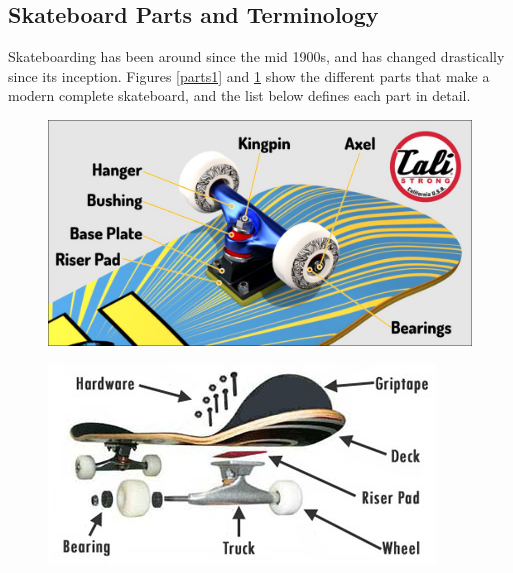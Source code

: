 \documentclass[letterpaper,12pt]{article}
\begin{document}
\subsection{Skateboard Parts and Terminology}
Skateboarding has been around since the mid 1900s, and has changed drastically since its inception. Figures \ref{parts1} and \ref{parts2} show the different parts that make a modern complete skateboard, and the list below defines each part in detail.
\begin{figure}[!htbp]\centering
\begin{minipage}{.5\textwidth}\centering
\includegraphics[width=.8\textwidth]{parts1.jpg}
\label{parts1}
\end{minipage}%
\begin{minipage}{.5\textwidth}\centering
\includegraphics[width=.8\textwidth]{parts2.jpg}
\label{parts2}
\end{minipage}
\end{figure}
\end{document}
